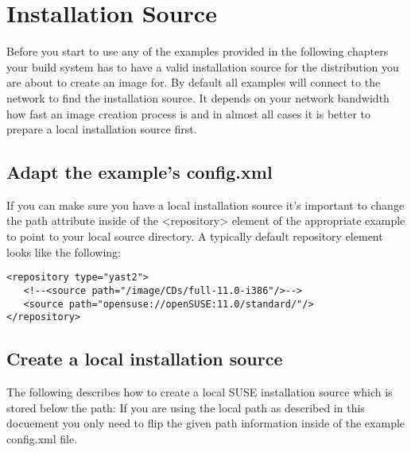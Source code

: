\chapter{Installation Source}
\label{chapter:instsourcesetup}
\minitoc

Before you start to use any of the examples provided in the following
chapters your build system has to have a valid installation source for
the distribution you are about to create an image for.
By default all examples will connect to the network to find the
installation source. It depends on your network bandwidth how fast
an image creation process is and in almost all cases it is better
to prepare a local installation source first.

\section{Adapt the example's config.xml}
If you can make
sure you have a local installation source it's important to change
the path attribute inside of the <repository> element of the
appropriate example to point to your local source directory.
A typically default repository element looks like the following:

\begin{verbatim}
<repository type="yast2">
   <!--<source path="/image/CDs/full-11.0-i386"/>-->
   <source path="opensuse://openSUSE:11.0/standard/"/>
</repository>
\end{verbatim}

\section{Create a local installation source}
The following describes how to create a local SUSE installation
source which is stored below the path: 
If you are using the local path as described in this docuement
you only need to flip the given path information inside of
the example config.xml file.

